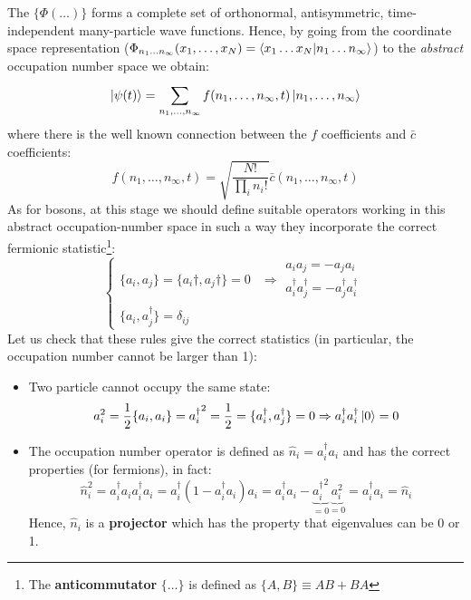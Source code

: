 \documentclass[../main/main.tex]{subfiles}
\begin{document}
The \( \{ \Phi (\dots) \}   \) forms a complete set of orthonormal, antisymmetric, time-independent many-particle wave functions. Hence, by going from the coordinate space representation (\( \Phi _{n_1 \dots n_ \infty } (x_1, \dots, x_N) = \bra{x_1 \dots x_N} \ket{n_1 \dots n_ \infty }  \)) to the \emph{abstract} occupation number space we obtain:
\begin{equation*}
  \ket{\psi (t)} = \sum_{n_1, \dots, n_ \infty }^{} f(n_1, \dots, n_ \infty ,t) \ket{n_1, \dots, n_ \infty }
\end{equation*}
where there is the well known connection between the \( f \) coefficients and \( \bar{c}  \) coefficients:
\begin{equation*}
  f(n_1, \dots, n_ \infty ,t) = \sqrt{\frac{N!}{\prod_{i}^{} n_i!  }} \bar{c}  (n_1, \dots, n_ \infty ,t)
\end{equation*}
As for bosons, at this stage we should define suitable operators working in this abstract occupation-number space in such a way they incorporate the correct fermionic statistic\footnote{The \textbf{anticommutator} \( \{  \dots \}  \) is defined as  \( \{ A,B\} \equiv AB+BA   \) }:
\begin{equation}
  \begin{cases}
   \{a_i,a_j  \} = \{ a_i\dag,a_j\dag \} = 0 & \Rightarrow  \substack{   a_i a_j = - a_j a_i   \\   a_i^\dag a_j^\dag = - a_j^\dag a_i^\dag  }   \\
  \{ a_i, a_j^\dag \} = \delta _{ij}
  \end{cases}
\end{equation}
Let us check that these rules give the correct statistics (in particular, the occupation number cannot be larger than 1):
\begin{itemize}
\item Two particle cannot occupy the same state:
\begin{equation*}
  a_i^2 = \frac{1}{2} \{ a_i,a_i \} = {a_i^\dag}^2 = \frac{1}{2} = \{ a_i^\dag,a_j^\dag \}=0  \Rightarrow a_i^\dag a_i^\dag \ket{0} = 0
\end{equation*}
\item The occupation number operator is defined as \( \hat{n}_i=a_i^\dag a_i  \) and has the correct properties (for fermions), in fact:
\begin{equation*}
  \hat{n}_i^2 = a_i^\dag a_i a_i^\dag a_i = a_i^\dag (1 - a_i^\dag a_i) a_i = a_i^\dag a_i - \underbrace{{a_i^\dag}^2}_{=0}  \underbrace{a_i^2}_{=0}  = a_i^\dag a_i = \hat{n}_i
\end{equation*}
Hence, \( \hat{n}_i  \) is a \textbf{projector} which has the property that eigenvalues can be 0 or 1.
\end{itemize}
\end{document}
